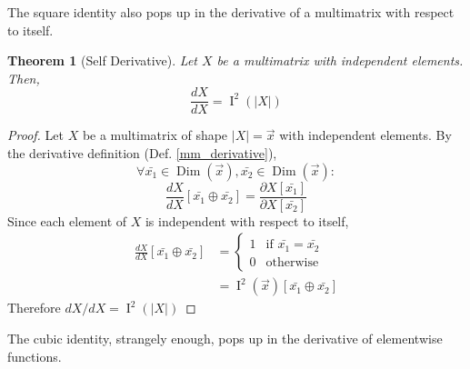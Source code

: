 \documentclass[12pt]{article}
\theoremstyle{definition}
\theoremstyle{plain}
\newtheorem{theorem}{Theorem}[section]
\theoremstyle{ppart}
\DeclareMathOperator{\Dim}{Dim}
\DeclareMathOperator{\Ident}{I}
\begin{document}
The square identity also pops up in the derivative of a multimatrix
with respect to itself.

\begin{theorem}[Self Derivative]
Let $X$ be a multimatrix with independent elements. Then,
\[ \frac{dX}{dX} = \Ident^2(|X|) \]
\end{theorem}
\begin{proof}
Let $X$ be a multimatrix of shape $|X|=\vec{x}$ with independent elements.
By the derivative definition (Def. \ref{mm_derivative}),
\[
 \forall \bar{x_1} \in \Dim(\vec{x}),
         \bar{x_2} \in \Dim(\vec{x}):
\]
\[
 \frac{dX}{dX}[\bar{x_1} \oplus \bar{x_2}] = 
 \frac{\partial X[\bar{x_1}]}{\partial X[\bar{x_2}]}
\]
Since each element of $X$ is independent with respect to itself,
\begin{align*}
 \frac{dX}{dX}[\bar{x_1} \oplus \bar{x_2}]
 &= \left\{
  \begin{array}{ll}
    1 & \mbox{if } \bar{x_1} = \bar{x_2} \\
    0 & \mbox{otherwise}
  \end{array}
 \right. \\
 &= \Ident^2(\vec{x})[\bar{x_1} \oplus \bar{x_2}]
\end{align*}
Therefore $dX/dX = \Ident^2(|X|)$
\end{proof}

The cubic identity, strangely enough, pops up in the derivative of elementwise
functions.
\end{document}
